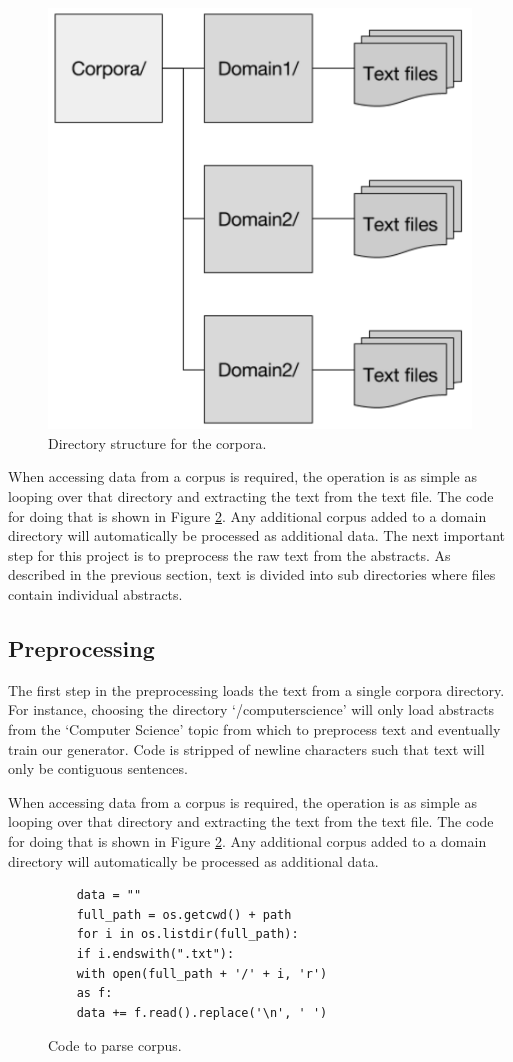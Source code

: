 \documentclass[letterpaper, 10 pt, conference]{ieeeconf}  %
\begin{document}
\begin{figure}[!ht]
	\centering
	\includegraphics[width=.4\textwidth]{filestruct}
	\caption{Directory structure for the corpora.}
	\label{fig:Directorystructure}
\end{figure}


When accessing data from a corpus is required, the operation is as simple as looping over that directory and extracting the text from the text file. The code for doing that is shown in Figure \ref{fig:Codeparse}.  Any additional corpus added to a domain directory will automatically be processed as additional data. The next important step for this project is to preprocess the raw text from the abstracts. As described in the previous section, text is divided into sub directories where files contain individual abstracts.

\subsection{Preprocessing}

The first step in the preprocessing loads the text from a single corpora directory. For instance, choosing the directory ‘/computerscience’ will only load abstracts from the ‘Computer Science’ topic from which to preprocess text and eventually train our generator. Code is stripped of newline characters such that text will only be contiguous sentences.

When accessing data from a corpus is required, the operation is as simple as looping over that directory and extracting the text from the text file. The code for doing that is shown in Figure \ref{fig:Codeparse}. Any additional corpus added to a domain directory will automatically be processed as additional data.

\begin{figure}[!ht]
	\begin{verbatim}
	data = ""
	full_path = os.getcwd() + path
	for i in os.listdir(full_path):
	if i.endswith(".txt"):
	with open(full_path + '/' + i, 'r')
	as f:
	data += f.read().replace('\n', ' ')
	\end{verbatim}

	\caption{Code to parse corpus.}
	\label{fig:Codeparse}
\end{figure}
\end{document}
